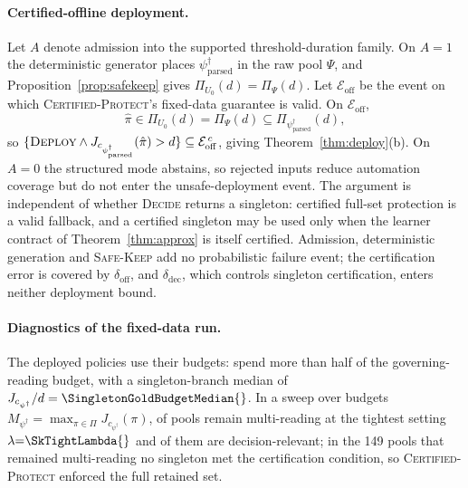 \paragraph{Certified-offline deployment.}
Let \(A\) denote admission into the supported threshold-duration family. On
\(A=1\) the deterministic generator places \(\psi^\dagger_{\mathrm{parsed}}\) in the
raw pool \(\Psi\), and Proposition~\ref{prop:safekeep} gives
\(\Pi_{U_0}(d)=\Pi_\Psi(d)\). Let \(\mathcal E_{\mathrm{off}}\) be the
event on which \textsc{Certified-Protect}'s fixed-data guarantee is valid. On
\(\mathcal E_{\mathrm{off}}\),
\[
\hat\pi\in\Pi_{U_0}(d)=\Pi_\Psi(d)\subseteq\Pi_{\psi^\dagger_{\mathrm{parsed}}}(d),
\]
so \(\{\textsc{Deploy}\wedge J_{c_{\psi^\dagger_{\mathrm{parsed}}}}(\hat\pi)>d\}
\subseteq\mathcal E_{\mathrm{off}}^{\,c}\), giving Theorem~\ref{thm:deploy}(b). On
\(A=0\) the structured mode abstains, so rejected inputs reduce automation coverage
but do not enter the unsafe-deployment event. The argument is independent of whether
\textsc{Decide} returns a singleton: certified full-set protection is a valid
fallback, and a certified singleton may be used only when the learner contract of
Theorem~\ref{thm:approx} is itself certified. Admission, deterministic generation and
\textsc{Safe-Keep} add no probabilistic failure event; the certification error is covered by
\(\delta_{\mathrm{off}}\), and \(\delta_{\mathrm{dec}}\), which controls singleton
certification, enters neither deployment bound.

\paragraph{Diagnostics of the fixed-data run.} The deployed policies use their budgets:
\HighBudgetUsePct{} spend more than half of the governing-reading budget, with a singleton-branch
median of \(J_{c_{\psi^\dagger}}/d=\SingletonGoldBudgetMedian{}\). In a sweep over budgets
\(M_{\psi^\dagger}=\max_{\pi\in\Pi}J_{c_{\psi^\dagger}}(\pi)\), \SkMultiReadingTight{} of
\SkSubfamilies{} pools remain multi-reading at the tightest setting \(\lambda{=}\SkTightLambda{}\)
and \SkDecisionRelevantTight{} of them are decision-relevant; in the 149 pools that remained
multi-reading no singleton met the certification condition, so \textsc{Certified-Protect}
enforced the full retained set.
